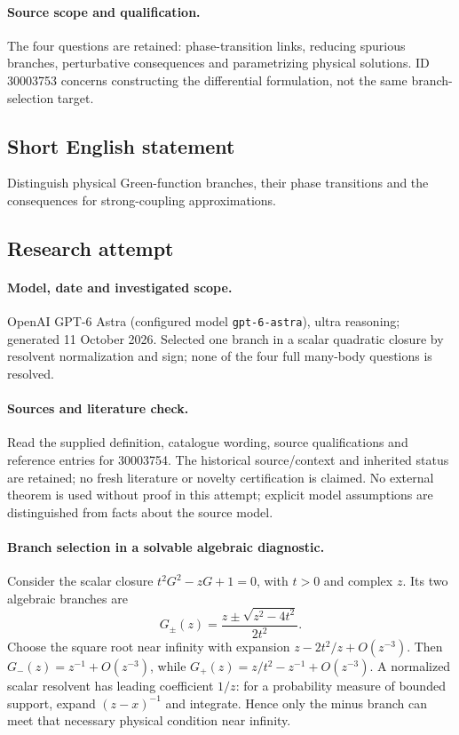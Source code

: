 \documentclass[11pt]{article}
\begin{document}
\paragraph{Source scope and qualification.}
The four questions are retained: phase-transition links, reducing spurious branches, perturbative consequences and parametrizing physical solutions. ID 30003753 concerns constructing the differential formulation, not the same branch-selection target.
\subsection{Short English statement}
Distinguish physical Green-function branches, their phase transitions and the consequences for strong-coupling approximations.
\subsection{Research attempt}
\paragraph{Model, date and investigated scope.}
OpenAI GPT-6 Astra (configured model \texttt{gpt-6-astra}), ultra reasoning; generated 11 October 2026. Selected one branch in a scalar quadratic closure by resolvent normalization and sign; none of the four full many-body questions is resolved.

\paragraph{Sources and literature check.}
Read the supplied definition, catalogue wording, source qualifications and reference entries for 30003754. The historical source/context and inherited status are retained; no fresh literature or novelty certification is claimed. No external theorem is used without proof in this attempt; explicit model assumptions are distinguished from facts about the source model.

\paragraph{Branch selection in a solvable algebraic diagnostic.} Consider the scalar closure \(t^2G^2-zG+1=0\), with \(t>0\) and complex \(z\). Its two algebraic branches are
\[
 G_\pm(z)=\frac{z\pm\sqrt{z^2-4t^2}}{2t^2}.
\]
Choose the square root near infinity with expansion \(z-2t^2/z+O(z^{-3})\). Then \(G_-(z)=z^{-1}+O(z^{-3})\), while \(G_+(z)=z/t^2-z^{-1}+O(z^{-3})\). A normalized scalar resolvent has leading coefficient \(1/z\): for a probability measure of bounded support, expand \((z-x)^{-1}\) and integrate. Hence only the minus branch can meet that necessary physical condition near infinity.
\end{document}
